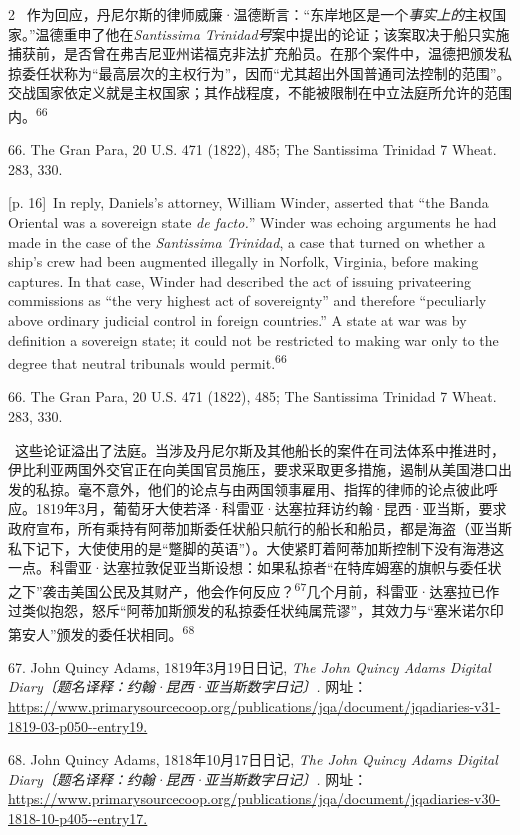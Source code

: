 \documentclass[10pt,a4paper]{article}
\begin{document}
\begin{paracol}{2}
\switchcolumn*
{\scriptsize\color{gray} [p. 16]}\ 作为回应，丹尼尔斯的律师威廉·温德断言：“东岸地区是一个\textit{事实上的}主权国家。”温德重申了他在\textit{Santissima Trinidad号}案中提出的论证；该案取决于船只实施捕获前，是否曾在弗吉尼亚州诺福克非法扩充船员。在那个案件中，温德把颁发私掠委任状称为“最高层次的主权行为”，因而“尤其超出外国普通司法控制的范围”。交战国家依定义就是主权国家；其作战程度，不能被限制在中立法庭所允许的范围\mbox{内。\textsuperscript{66}}\par{\small 66. The Gran Para, 20 U.S. 471 (1822), 485; The Santissima Trinidad 7 Wheat. 283, 330.\par}
\switchcolumn
{\scriptsize\color{gray} [p. 16]}\ In reply, Daniels’s attorney, William Winder, asserted that “the Banda Oriental was a sovereign state \textit{de facto.}” Winder was echoing arguments he had made in the case of the \textit{Santissima Trinidad}, a case that turned on whether a ship’s crew had been augmented illegally in Norfolk, Virginia, before making captures. In that case, Winder had described the act of issuing privateering commissions as “the very highest act of sovereignty” and therefore “peculiarly above ordinary judicial control in foreign countries.” A state at war was by definition a sovereign state; it could not be restricted to making war only to the degree that neutral tribunals would permit.\nobreak\textsuperscript{66}\par{\small 66. The Gran Para, 20 U.S. 471 (1822), 485; The Santissima Trinidad 7 Wheat. 283, 330.\par}
\switchcolumn*
{\scriptsize\color{gray} [p. 16]}\ 这些论证溢出了法庭。当涉及丹尼尔斯及其他船长的案件在司法体系中推进时，伊比利亚两国外交官正在向美国官员施压，要求采取更多措施，遏制从美国港口出发的私掠。毫不意外，他们的论点与由两国领事雇用、指挥的律师的论点彼此呼应。1819年3月，葡萄牙大使若泽·科雷亚·达塞拉拜访约翰·昆西·亚当斯，要求政府宣布，所有乘持有阿蒂加斯委任状船只航行的船长和船员，都是海盗（亚当斯私下记下，大使使用的是“蹩脚的英语”）。大使紧盯着阿蒂加斯控制下没有海港这一点。科雷亚·达塞拉敦促亚当斯设想：如果私掠者“在特库姆塞的旗帜与委任状之下”袭击美国公民及其财产，他会作何反\mbox{应？\textsuperscript{67}}几个月前，科雷亚·达塞拉已作过类似抱怨，怒斥“阿蒂加斯颁发的私掠委任状纯属荒谬”，其效力与“塞米诺尔印第安人”颁发的委任状相\mbox{同。\textsuperscript{68}}\par{\small 67. John Quincy Adams, 1819年3月19日日记, \textit{The John Quincy Adams Digital Diary〔题名译释：约翰·昆西·亚当斯数字日记〕.} 网址： \url{https://www.primarysourcecoop.org/publications/jqa/document/jqadiaries-v31-1819-03-p050--entry19.}\par}{\small 68. John Quincy Adams, 1818年10月17日日记, \textit{The John Quincy Adams Digital Diary〔题名译释：约翰·昆西·亚当斯数字日记〕.} 网址： \url{https://www.primarysourcecoop.org/publications/jqa/document/jqadiaries-v30-1818-10-p405--entry17.}\par}

\end{paracol}
\end{document}
